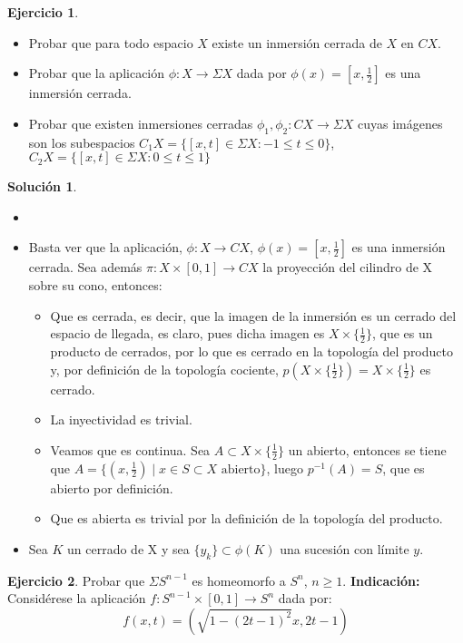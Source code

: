 \documentclass{article}
\theoremstyle{plain}
\theoremstyle{definition}
\newtheorem{exercise}{Ejercicio}
\newtheorem*{sol*}{Solución}
\begin{document}
\newpage
\begin{exercise}\mbox{}
\begin{itemize}
	\item Probar que para todo espacio $X$ existe un inmersión cerrada de $X$ en $C X$.
	\item Probar que la aplicación $\phi : X \to \Sigma X$ dada por $\phi(x) = [x, \frac{1}{2}]$ es una inmersión cerrada.
	\item Probar que existen inmersiones cerradas $\phi_1, \phi_2 : C X \to \Sigma X$ cuyas imágenes son los subespacios $C_1 X = \{[x,t] \in \Sigma X : -1 \leq t \leq 0\}$, $C_2 X = \{[x,t] \in \Sigma X : 0 \leq t \leq 1\}$
\end{itemize}
\end{exercise}
\begin{sol*}
\begin{itemize}
\item[]
\item Basta ver que la aplicación, $\phi:X\to CX$, $\phi(x) = [x, \frac{1}{2}]$ es una inmersión cerrada. Sea además $\pi: X\times [0,1]\to CX$ la proyección del cilindro de X sobre su cono, entonces: 
\begin{itemize}
\item Que es cerrada, es decir, que la imagen de la inmersión es un cerrado del espacio de llegada, es claro, pues dicha imagen es $X\times \{\frac{1}{2}\}$, que es un producto de cerrados, por lo que es cerrado en la topología del producto y, por definición de la topología cociente, $p(X\times\{\frac{1}{2}\}) = X\times\{\frac{1}{2}\}$ es cerrado.
\item La inyectividad es trivial. 
\item Veamos que es continua. Sea $A\subset X\times \{\frac{1}{2}\}$ un abierto, entonces se tiene que $A =\{(x,\frac{1}{2})\mid x\in S\subset X\text{ abierto}\}$, luego $p^{-1}(A) = S$, que es abierto por definición.
\item Que es abierta es trivial por la definición de la topología del producto.
\end{itemize}
\item Sea $K$ un cerrado de X y sea $\{y_k\}\subset \phi(K)$ una sucesión con límite $y$. 
\end{itemize}
\end{sol*}
\newpage
\begin{exercise}
Probar que $\Sigma S^{n-1}$ es homeomorfo a $S^n$, $n \geq 1$. \textbf{Indicación:} Considérese la aplicación $f : S^{n-1} \times [0,1] \to S^n$ dada por:
\[ f(x,t) = (\sqrt{1-(2t-1)^2}x, 2t-1) \]
\end{exercise}
\end{document}
